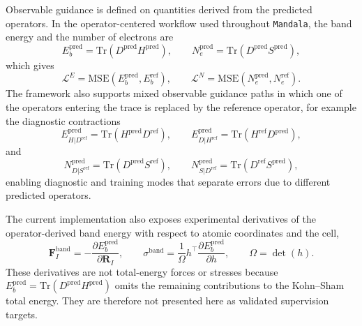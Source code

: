 \documentclass[preprint,12pt,compress,numafflabel]{elsarticle}
\newcommand{\Tr}{\mathrm{Tr}}
\newcommand{\Loss}{\mathcal{L}}
\begin{document}
Observable guidance is defined on quantities derived from the predicted operators.
In the operator-centered workflow used throughout \texttt{Mandala}, the band energy and the number of electrons are
\begin{equation}
E_b^{\mathrm{pred}} = \Tr(D^{\mathrm{pred}}H^{\mathrm{pred}}),
\qquad
N_e^{\mathrm{pred}} = \Tr(D^{\mathrm{pred}}S^{\mathrm{pred}}),
\end{equation}
which gives
\begin{equation}
\Loss^E = \mathrm{MSE}(E_b^{\mathrm{pred}},E_b^{\mathrm{ref}}),
\qquad
\Loss^N = \mathrm{MSE}(N_e^{\mathrm{pred}},N_e^{\mathrm{ref}}).
\end{equation}
The framework also supports mixed observable guidance paths in which one of the operators entering the trace is replaced by the reference operator, for example the diagnostic contractions
\begin{equation}
E_{H|D^{\mathrm{ref}}}^{\mathrm{pred}}
=
\Tr\!\left(H^{\mathrm{pred}} D^{\mathrm{ref}}\right),
\qquad
E_{D|H^{\mathrm{ref}}}^{\mathrm{pred}}
=
\Tr\!\left(H^{\mathrm{ref}} D^{\mathrm{pred}}\right),
\end{equation}
and
\begin{equation}
N_{D|S^{\mathrm{ref}}}^{\mathrm{pred}}
=
\Tr\!\left(D^{\mathrm{pred}} S^{\mathrm{ref}}\right),
\qquad
N_{S|D^{\mathrm{ref}}}^{\mathrm{pred}}
=
\Tr\!\left(D^{\mathrm{ref}} S^{\mathrm{pred}}\right),
\end{equation}
enabling diagnostic and training modes that separate errors due to different predicted operators.

The current implementation also exposes experimental derivatives of the operator-derived band energy with respect to atomic coordinates and the cell,
\begin{equation}
\bm{F}^{\mathrm{band}}_I
=
-\frac{\partial E_b^{\mathrm{pred}}}{\partial \bm{R}_I},
\qquad
\sigma^{\mathrm{band}}
=
\frac{1}{\Omega}h^{\top}
\frac{\partial E_b^{\mathrm{pred}}}{\partial h},
\qquad \Omega=\det(h).
\end{equation}
These derivatives are not total-energy forces or stresses because $E_b^{\mathrm{pred}}=\Tr(D^{\mathrm{pred}}H^{\mathrm{pred}})$ omits the remaining contributions to the Kohn--Sham total energy.
They are therefore not presented here as validated supervision targets.
\end{document}
